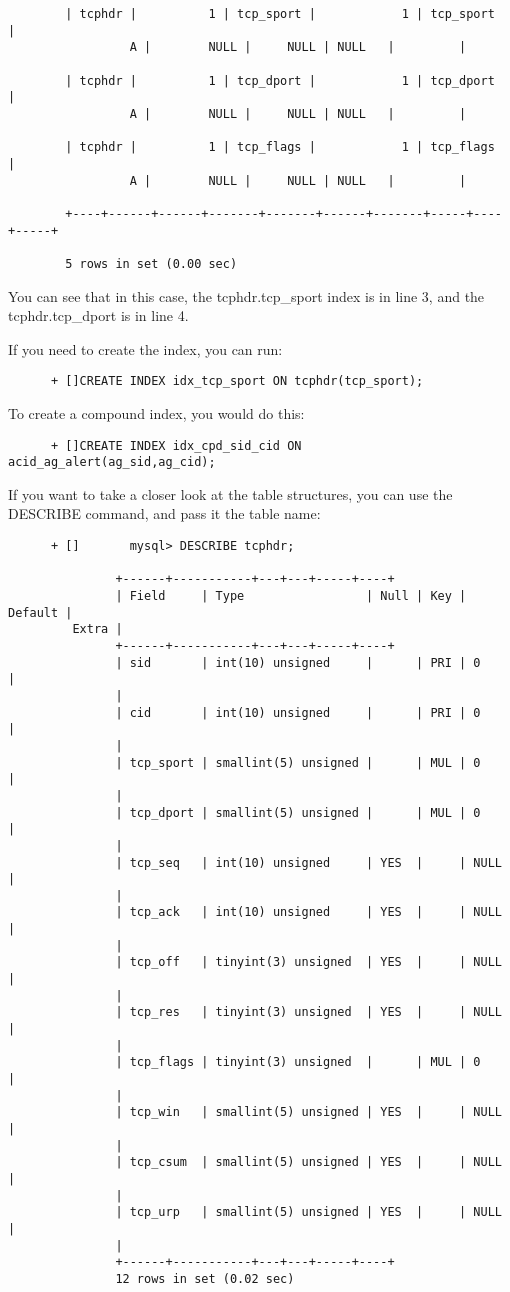 \documentclass{article}
\begin{document}
\begin{itemize}
\begin{verbatim}
        | tcphdr |          1 | tcp_sport |            1 | tcp_sport   |
                 A |        NULL |     NULL | NULL   |         |

        | tcphdr |          1 | tcp_dport |            1 | tcp_dport   |
                 A |        NULL |     NULL | NULL   |         |

        | tcphdr |          1 | tcp_flags |            1 | tcp_flags   |
                 A |        NULL |     NULL | NULL   |         |

        +----+------+------+-------+-------+------+-------+-----+----+-----+

        5 rows in set (0.00 sec)
\end{verbatim}
    You can see that in this case, the tcphdr.tcp\_sport index is in line 3, and
    the tcphdr.tcp\_dport is in line 4.

    If you need to create the index, you can run:
    \begin{verbatim}
      + []CREATE INDEX idx_tcp_sport ON tcphdr(tcp_sport);
      \end{verbatim}
    To create a compound index, you would do this:
    \begin{verbatim}
      + []CREATE INDEX idx_cpd_sid_cid ON acid_ag_alert(ag_sid,ag_cid);
     \end{verbatim}
    If you want to take a closer look at the table structures, you can use the
    DESCRIBE command, and pass it the table name:
    \begin{verbatim}
      + []       mysql> DESCRIBE tcphdr;

               +------+-----------+---+---+-----+----+
               | Field     | Type                 | Null | Key | Default |
         Extra |
               +------+-----------+---+---+-----+----+
               | sid       | int(10) unsigned     |      | PRI | 0       |
               |
               | cid       | int(10) unsigned     |      | PRI | 0       |
               |
               | tcp_sport | smallint(5) unsigned |      | MUL | 0       |
               |
               | tcp_dport | smallint(5) unsigned |      | MUL | 0       |
               |
               | tcp_seq   | int(10) unsigned     | YES  |     | NULL    |
               |
               | tcp_ack   | int(10) unsigned     | YES  |     | NULL    |
               |
               | tcp_off   | tinyint(3) unsigned  | YES  |     | NULL    |
               |
               | tcp_res   | tinyint(3) unsigned  | YES  |     | NULL    |
               |
               | tcp_flags | tinyint(3) unsigned  |      | MUL | 0       |
               |
               | tcp_win   | smallint(5) unsigned | YES  |     | NULL    |
               |
               | tcp_csum  | smallint(5) unsigned | YES  |     | NULL    |
               |
               | tcp_urp   | smallint(5) unsigned | YES  |     | NULL    |
               |
               +------+-----------+---+---+-----+----+
               12 rows in set (0.02 sec)
	     \end{verbatim}
	     \end{itemize}
\end{document}
